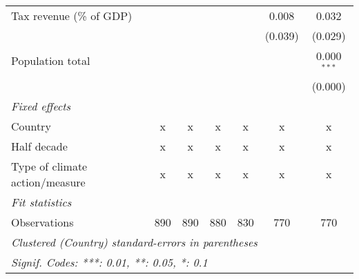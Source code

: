 \begin{tabular}{lcccccc}
   Tax revenue (\% of GDP)                            &         &         &         &                & 0.008          & 0.032\\   
                                                      &         &         &         &                & (0.039)        & (0.029)\\   
   Population total                                   &         &         &         &                &                & 0.000$^{***}$\\   
                                                      &         &         &         &                &                & (0.000)\\   
   \emph{Fixed effects}\\
   Country                                            & x       & x       & x       & x              & x              & x\\  
   Half decade                                        & x       & x       & x       & x              & x              & x\\  
   Type of climate action/measure                     & x       & x       & x       & x              & x              & x\\  
   \midrule \emph{Fit statistics}\\
   Observations                                       & 890     & 890     & 880     & 830            & 770            & 770\\  
   \midrule
   \multicolumn{7}{l}{\emph{Clustered (Country) standard-errors in parentheses}}\\
   \multicolumn{7}{l}{\emph{Signif. Codes: ***: 0.01, **: 0.05, *: 0.1}}\\
\end{tabular}
\par\endgroup


